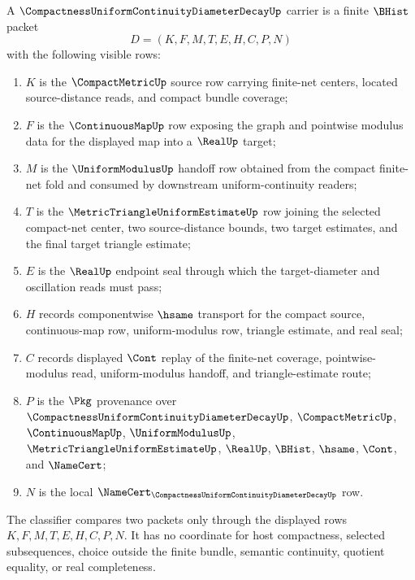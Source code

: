 \begin{definition}
\label{def:compactness-uniform-continuity-diameter-decay}
A $\CompactnessUniformContinuityDiameterDecayUp$ carrier is a finite $\BHist$ packet
$$
D=(K,F,M,T,E,H,C,P,N)
$$
with the following visible rows:
\begin{enumerate}
\item $K$ is the $\CompactMetricUp$ source row carrying finite-net centers, located source-distance reads, and compact bundle coverage;
\item $F$ is the $\ContinuousMapUp$ row exposing the graph and pointwise modulus data for the displayed map into a $\RealUp$ target;
\item $M$ is the $\UniformModulusUp$ handoff row obtained from the compact finite-net fold and consumed by downstream uniform-continuity readers;
\item $T$ is the $\MetricTriangleUniformEstimateUp$ row joining the selected compact-net center, two source-distance bounds, two target estimates, and the final target triangle estimate;
\item $E$ is the $\RealUp$ endpoint seal through which the target-diameter and oscillation reads must pass;
\item $H$ records componentwise $\hsame$ transport for the compact source, continuous-map row, uniform-modulus row, triangle estimate, and real seal;
\item $C$ records displayed $\Cont$ replay of the finite-net coverage, pointwise-modulus read, uniform-modulus handoff, and triangle-estimate route;
\item $P$ is the $\Pkg$ provenance over $\CompactnessUniformContinuityDiameterDecayUp$, $\CompactMetricUp$, $\ContinuousMapUp$, $\UniformModulusUp$, $\MetricTriangleUniformEstimateUp$, $\RealUp$, $\BHist$, $\hsame$, $\Cont$, and $\NameCert$;
\item $N$ is the local $\NameCert_{\CompactnessUniformContinuityDiameterDecayUp}$ row.
\end{enumerate}
The classifier compares two packets only through the displayed rows $K,F,M,T,E,H,C,P,N$. It has no coordinate for host compactness, selected subsequences, choice outside the finite bundle, semantic continuity, quotient equality, or real completeness.
\end{definition}

